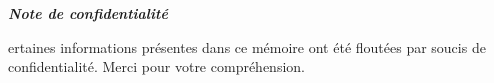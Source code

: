 \thispagestyle{empty}
\vspace*{2cm}
\begin{center}
    \huge{\textbf{\textit{Note de confidentialité}}}
\end{center}
\bigskip
\medskip 
\vspace{2cm}
\begin{center}
\large{
ertaines informations présentes dans ce mémoire ont été floutées par soucis de confidentialité. Merci pour votre compréhension.
}
\end{center}



\clearpage

